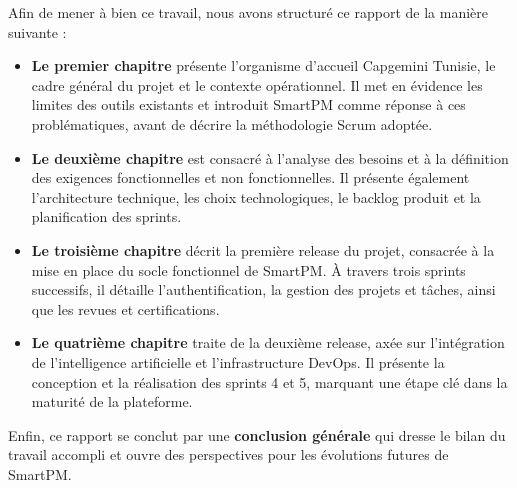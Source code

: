 \vspace{0.3cm}

Afin de mener à bien ce travail, nous avons structuré ce rapport de la manière suivante :

\begin{itemize}[leftmargin=2cm]
  \item \textbf{Le premier chapitre} présente l'organisme d'accueil Capgemini Tunisie, le
  cadre général du projet et le contexte opérationnel. Il met en évidence les limites des
  outils existants et introduit SmartPM comme réponse à ces problématiques, avant de décrire
  la méthodologie Scrum adoptée.

  \item \textbf{Le deuxième chapitre} est consacré à l'analyse des besoins et à la définition
  des exigences fonctionnelles et non fonctionnelles. Il présente également l'architecture
  technique, les choix technologiques, le backlog produit et la planification des sprints.

  \item \textbf{Le troisième chapitre} décrit la première release du projet, consacrée à la
  mise en place du socle fonctionnel de SmartPM. À travers trois sprints successifs, il détaille
  l'authentification, la gestion des projets et tâches, ainsi que les revues et certifications.

  \item \textbf{Le quatrième chapitre} traite de la deuxième release, axée sur l'intégration
  de l'intelligence artificielle et l'infrastructure DevOps. Il présente la conception et la
  réalisation des sprints 4 et 5, marquant une étape clé dans la maturité de la plateforme.
\end{itemize}

\vspace{0.3cm}

Enfin, ce rapport se conclut par une \textbf{conclusion générale} qui dresse le bilan du
travail accompli et ouvre des perspectives pour les évolutions futures de SmartPM.
